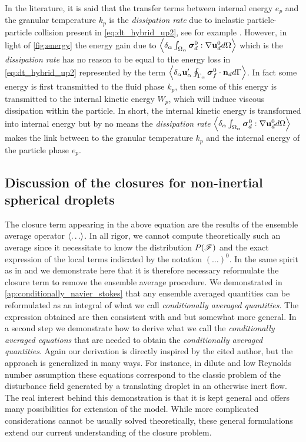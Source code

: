 In the literature, it is said that the transfer terms between internal energy $e_p$ and the granular temperature $k_p$ is the \textit{dissipation rate} due to inelastic particle-particle collision present in \ref{eq:dt_hybrid_up2}, see for example \citet{fox2014multiphase,rao2008introduction}. 
However, in light of \ref{fig:energy} the energy gain due to  $\left<\delta_\alpha \int_{\Omega_\alpha} \bm{\sigma}_d^0:\mathbf{\nabla} \textbf{u}_d^0 d\Omega\right>$ which is the \textit{dissipation rate} has no reason to be equal to the energy loss in \ref{eq:dt_hybrid_up2} represented by the term $\left<\delta_\alpha \textbf{u}_\alpha' \oint_{\Gamma_\alpha} \bm{\sigma}_f^0 \cdot \textbf{n}_d d\Gamma\right>$. 
In fact some energy is first transmitted to the fluid phase $k_p$, then some of this energy is transmitted to the internal kinetic energy $W_p$, which will induce viscous dissipation within the particle. 
In short, the internal kinetic energy is transformed into internal energy but by no means the \textit{dissipation rate} $\left<\delta_\alpha \int_{\Omega_\alpha} \bm{\sigma}_d^0:\mathbf{\nabla} \textbf{u}_d^0 d\Omega\right>$ makes the link between to the granular temperature $k_p$ and the internal energy of the particle phase $e_p$. 



\subsection{Discussion of the closures for non-inertial spherical droplets}

The closure term appearing in the above equation are the results of the ensemble average operator $\left<\ldots\right>$. 
In all rigor, we cannot compute theoretically such an average since it necessitate to know the distribution $P(\mathscr{F})$ and the exact expression of the local terms indicated by the notation $(\ldots)^0$. 
In the same spirit as in \citet{batchelor1972sedimentation,hinch1977averaged} and \citet{zhang1994averaged} we demonstrate here that it is therefore necessary reformulate the closure term to remove the ensemble average procedure. 
We demonstrated in \ref{ap:conditionally_navier_stokes} that any ensemble averaged quantities can be reformulated as an integral of what we call \textit{conditionally averaged quantities}. 
The expression obtained are then consistent with \citet{batchelor1972sedimentation,hinch1977averaged} and \citet{zhang1994averaged} but somewhat more general. 
In a second step we demonstrate how to derive what we call the \textit{conditionally averaged equations} that are needed to obtain the \textit{conditionally averaged quantities}. 
Again our derivation is directly inspired by the cited author, but the approach is generalized in many ways. 
For instance, in dilute and low Reynolds number assumption these equations correspond to the classic problem of the disturbance field generated by a translating droplet in an otherwise inert flow. 
The real interest behind this demonstration is that it is kept general and offers many possibilities for extension of the model.
While more complicated considerations cannot be usually solved theoretically, these general formulations extend our current understanding of the closure problem. 

